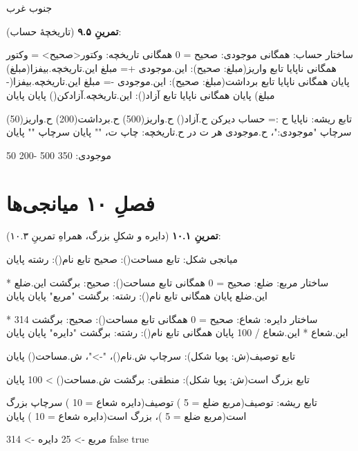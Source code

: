 \begin{progoutfa}
جنوب غرب
\end{progoutfa}

\textbf{تمرینِ ۹.۵} (تاریخچهٔ حساب):
\begin{salamfa}
ساختار حساب:
    همگانی موجودی: صحیح = 0
    همگانی تاریخچه: وکتور<صحیح> = وکتور {}
    همگانی ناپایا تابع واریز(مبلغ: صحیح):
        این.موجودی += مبلغ
        این.تاریخچه.بیفزا(مبلغ)
    پایان
    همگانی ناپایا تابع برداشت(مبلغ: صحیح):
        این.موجودی -= مبلغ
        این.تاریخچه.بیفزا(-مبلغ)
    پایان
    همگانی ناپایا تابع آزاد():
        این.تاریخچه.آزادکن()
    پایان
پایان

تابع ریشه:
    ناپایا ح := حساب {}
    دیرکن ح.آزاد()
    ح.واریز(500)
    ح.برداشت(200)
    ح.واریز(50)
    سرچاپ "موجودی:"، ح.موجودی
    هر ت در ح.تاریخچه:
        چاپ ت، ""
    پایان
    سرچاپ ""
پایان
\end{salamfa}

\begin{progoutfa}
موجودی: 350
500 -200 50
\end{progoutfa}

\section*{فصلِ ۱۰ میانجی‌ها}
{}

\textbf{تمرینِ ۱۰.۱} (دایره و شکلِ بزرگ، همراهِ تمرینِ ۱۰.۳):
\begin{salamfa}
میانجی شکل:
    تابع مساحت(): صحیح
    تابع نام(): رشته
پایان

ساختار مربع:
    ضلع: صحیح = 0
    همگانی تابع مساحت(): صحیح: برگشت این.ضلع * این.ضلع پایان
    همگانی تابع نام(): رشته: برگشت "مربع" پایان
پایان

ساختار دایره:
    شعاع: صحیح = 0
    همگانی تابع مساحت(): صحیح: برگشت 314 * این.شعاع * این.شعاع / 100 پایان
    همگانی تابع نام(): رشته: برگشت "دایره" پایان
پایان

تابع توصیف(ش: پویا شکل):
    سرچاپ ش.نام()، "->"، ش.مساحت()
پایان

تابع بزرگ است(ش: پویا شکل): منطقی:
    برگشت ش.مساحت() > 100
پایان

تابع ریشه:
    توصیف(مربع { ضلع = 5 })
    توصیف(دایره { شعاع = 10 })
    سرچاپ بزرگ است(مربع { ضلع = 5 })، بزرگ است(دایره { شعاع = 10 })
پایان
\end{salamfa}

\begin{progoutfa}
مربع -> 25
دایره -> 314
false true
\end{progoutfa}

